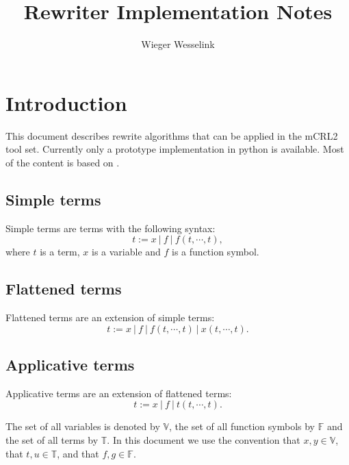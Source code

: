\documentclass{article}
\begin{document}
\title{Rewriter Implementation Notes}
\author{Wieger Wesselink}
\maketitle

\section{Introduction}

This document describes rewrite algorithms that can be applied in the mCRL2
tool set. Currently only a prototype implementation in python is available.
Most of the content is based on \cite{weerdenburg2009}.

\subsection{Simple terms}

Simple terms are terms with the following syntax:%
\begin{equation}
t:=x\ |\ f\ |\ f(t,\cdots ,t),  \label{eq:simple_terms}
\end{equation}%
where $t$ is a term, $x$ is a variable and $f$ is a function symbol.

\subsection{Flattened terms}

Flattened terms are an extension of simple terms:%
\begin{equation}
t:=x\ |\ f\ |\ f(t,\cdots ,t)\ |\ x(t,\cdots ,t).  \label{eq:flattened_terms}
\end{equation}

\subsection{Applicative terms}

Applicative terms are an extension of flattened terms:%
\begin{equation}
t:=x\ |\ f\ |\ t(t,\cdots ,t).  \label{eq:applicative_terms}
\end{equation}

The set of all variables is denoted by $\mathbb{V}$, the set of all function
symbols by $\mathbb{F}$ and the set of all terms by $\mathbb{T}$. In this
document we use the convention that $x,y\in \mathbb{V}$, that $t,u\in 
\mathbb{T}$, and that $f,g\in \mathbb{F}$.
\end{document}
